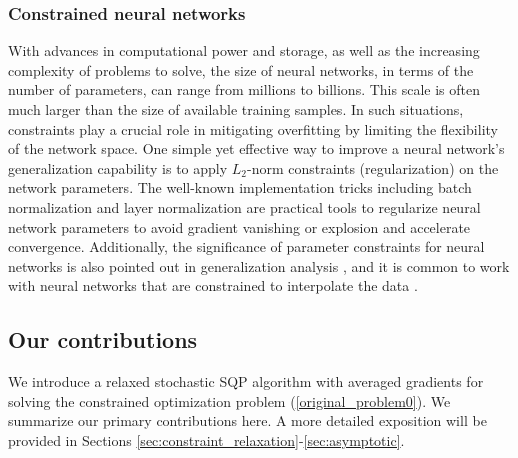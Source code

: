\documentclass[aos]{imsart}
\numberwithin{equation}{section}
\theoremstyle{plain}
\begin{document}
\subsubsection{Constrained neural networks}
With advances in computational power and storage, as well as the increasing complexity of problems to solve, the size of neural networks, in terms of the number of parameters, can range from millions to billions. This scale is often much larger than the size of available training samples. In such situations, constraints play a crucial role in mitigating overfitting by limiting the flexibility of the network space.
One simple yet effective way to improve a neural network's generalization capability is to apply $L_2$-norm constraints (regularization) on the network parameters. The well-known implementation tricks including batch normalization and layer normalization are practical tools to regularize neural network parameters to avoid gradient vanishing or explosion and accelerate convergence. Additionally, the significance of parameter constraints for neural networks is also pointed out in generalization analysis \cite{neyshabur2017exploring}, and it is common to work with neural networks that are constrained to interpolate the data \cite{iic_TR}.


\subsection{Our contributions}
We introduce a relaxed stochastic SQP algorithm with averaged gradients for solving the constrained optimization problem (\ref{original_problem0}). 
We summarize our primary contributions here.
A more detailed exposition will be provided in Sections \ref{sec:constraint_relaxation}-\ref{sec:asymptotic}.
\end{document}
